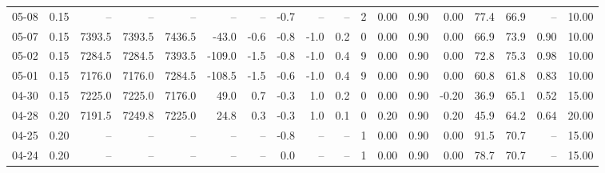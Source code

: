 \begin{threeparttable}
{\begin{tabular}{lrrrrrrrrrrrrrrrrr}
  05-08 &     0.15 &     -- &     -- &     -- &         -- &             -- &                      -0.7 &                       -- &                  -- &              2 &       0.00 &      0.90 &           0.00 &             77.4 &                66.9 &              -- &                  10.00 \\
  05-07 &     0.15 & 7393.5 & 7393.5 & 7436.5 &      -43.0 &           -0.6 &                      -0.8 &                     -1.0 &                 0.2 &              0 &       0.00 &      0.90 &           0.00 &             66.9 &                73.9 &            0.90 &                  10.00 \\
  05-02 &     0.15 & 7284.5 & 7284.5 & 7393.5 &     -109.0 &           -1.5 &                      -0.8 &                     -1.0 &                 0.4 &              9 &       0.00 &      0.90 &           0.00 &             72.8 &                75.3 &            0.98 &                  10.00 \\
  05-01 &     0.15 & 7176.0 & 7176.0 & 7284.5 &     -108.5 &           -1.5 &                      -0.6 &                     -1.0 &                 0.4 &              9 &       0.00 &      0.90 &           0.00 &             60.8 &                61.8 &            0.83 &                  10.00 \\
  04-30 &     0.15 & 7225.0 & 7225.0 & 7176.0 &       49.0 &            0.7 &                      -0.3 &                      1.0 &                 0.2 &              0 &       0.00 &      0.90 &          -0.20 &             36.9 &                65.1 &            0.52 &                  15.00 \\
  04-28 &     0.20 & 7191.5 & 7249.8 & 7225.0 &       24.8 &            0.3 &                      -0.3 &                      1.0 &                 0.1 &              0 &       0.20 &      0.90 &           0.20 &             45.9 &                64.2 &            0.64 &                  20.00 \\
  04-25 &     0.20 &     -- &     -- &     -- &         -- &             -- &                      -0.8 &                       -- &                  -- &              1 &       0.00 &      0.90 &           0.00 &             91.5 &                70.7 &              -- &                  15.00 \\
  04-24 &     0.20 &     -- &     -- &     -- &         -- &             -- &                       0.0 &                       -- &                  -- &              1 &       0.00 &      0.90 &           0.00 &             78.7 &                70.7 &              -- &                  15.00 \\

\end{tabular}}
\end{threeparttable}

